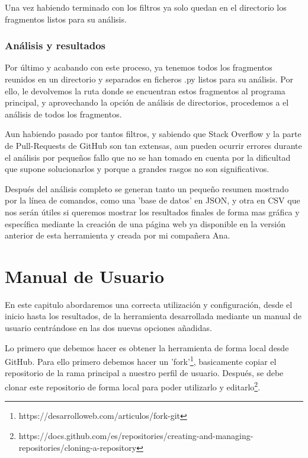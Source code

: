 \documentclass[a4paper, 12pt]{book}
\begin{document}
Una vez habiendo terminado con los filtros ya solo quedan en el directorio los fragmentos listos para su análisis.

\subsection{Análisis y resultados}

Por último y acabando con este proceso, ya tenemos todos los fragmentos reunidos en un directorio y separados en ficheros .py listos para su análisis. Por ello, le devolvemos la ruta donde se encuentran estos fragmentos al programa principal, y aprovechando la opción de análisis de directorios, procedemos a el análisis de todos los fragmentos.

Aun habiendo pasado por tantos filtros, y sabiendo que Stack Overflow y la parte de Pull-Requests de GitHub son tan extensas, aun pueden ocurrir errores durante el análisis por pequeños fallo que no se han tomado en cuenta por la dificultad que supone solucionarlos y porque a grandes rasgos no son significativos.

Después del análisis completo se generan tanto un pequeño resumen mostrado por la línea de comandos, como una 'base de datos' en JSON, y otra en CSV que nos serán útiles si queremos mostrar los resultados finales de forma mas gráfica y específica mediante la creación de una página web ya disponible en la versión anterior de esta herramienta y creada por mi compañera Ana. 



\cleardoublepage
\chapter{Manual de Usuario}

En este capitulo abordaremos una correcta utilización y configuración, desde el inicio hasta los resultados, de la herramienta desarrollada mediante un manual de usuario centrándose en las dos nuevas opciones añadidas.

Lo primero que debemos hacer es obtener la herramienta de forma local desde GitHub. Para ello primero debemos hacer un 'fork'\footnote{https://desarrolloweb.com/articulos/fork-git}, basicamente copiar el repositorio de la rama principal a nuestro perfil de usuario. Después, se debe clonar este repositorio de forma local para poder utilizarlo y editarlo\footnote{https://docs.github.com/es/repositories/creating-and-managing-repositories/cloning-a-repository}.
\end{document}
